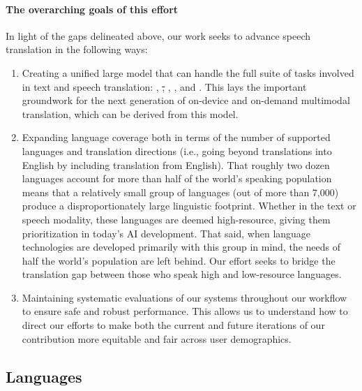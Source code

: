 \paragraph{The overarching goals of this effort}
In light of the gaps delineated above, our work seeks to advance speech translation in the following ways:
\begin{enumerate}
    \item Creating a unified large model that can handle the full suite of tasks involved in text and speech translation: \sst, \st, \ttst, \mt, and \asr. This lays the important groundwork for the next generation of on-device and on-demand multimodal translation, which can be derived from this model.
    \item Expanding language coverage both in terms of the number of supported languages and translation directions (i.e., going beyond translations into English by including translation from English). That roughly two dozen languages account for more than half of the world's speaking population means that a relatively small group of languages (out of more than 7,000) produce a disproportionately large linguistic footprint. Whether in the text or speech modality, these languages are deemed high-resource, giving them prioritization in today's AI development. That said, when language technologies are developed primarily with this group in mind, the needs of half the world's population are left behind. Our effort seeks to bridge the translation gap between those who speak high and low-resource languages.
    \item Maintaining systematic evaluations of our systems throughout our workflow to ensure safe and robust performance. This allows us to understand how to direct our efforts to make both the current and future iterations of our contribution more equitable and fair across user demographics. %
\end{enumerate}




\subsection{Languages}



\FloatBarrier
